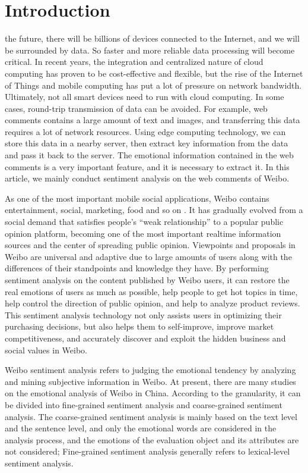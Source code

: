 \documentclass{ieeeaccess}
\begin{document}
\section{Introduction}
\label{sec:introduction}
 the future, there will be billions of devices connected to the Internet, and we will be surrounded by data. So faster and more reliable data processing will become critical. In recent years, the integration and centralized nature of cloud computing has proven to be cost-effective and flexible, but the rise of the Internet of Things and mobile computing has put a lot of pressure on network bandwidth. Ultimately, not all smart devices need to run with cloud computing. In some cases, round-trip transmission of data can be avoided. For example, web comments contains a large amount of text and images, and transferring this data requires a lot of network resources. Using edge computing technology, we can store this data in a nearby server, then extract key information from the data and pass it back to the server. The emotional information contained in the web comments is a very important feature, and it is necessary to extract it. In this article, we mainly conduct sentiment analysis on the web comments of Weibo.

As one of the most important mobile social applications, Weibo contains entertainment, social, marketing, food and so on \cite{DBLP:conf/IEEEcit/ChenLZW16}. It has gradually evolved from a social demand that satisfies people’s “we$  $ak relationship” to a popular public opinion platform, becoming one of the most important realtime information sources and the center of spreading public opinion. Viewpoints and proposals in Weibo are universal and adaptive due to large amounts of users along with the differences of their standpoints and knowledge they have. By performing sentiment analysis on the content published by Weibo users, it can restore the real emotions of users as much as possible, help people to get hot topics in time, help control the direction of public opinion, and help to analyze product reviews. This sentiment analysis technology not only assists users in optimizing their purchasing decisions, but also helps them to self-improve, improve market competitiveness, and accurately discover and exploit the hidden business and social values in Weibo.

Weibo sentiment analysis refers to judging the emotional tendency by analyzing and mining subjective information in Weibo. At present, there are many studies on the emotional analysis of Weibo in China. According to the granularity, it can be divided into fine-grained sentiment analysis and coarse-grained sentiment analysis. The coarse-grained sentiment analysis is mainly based on the text level and the sentence level, and only the emotional words are considered in the analysis process, and the emotions of the evaluation object and its attributes are not considered; Fine-grained sentiment analysis generally refers to lexical-level sentiment analysis.
\end{document}
